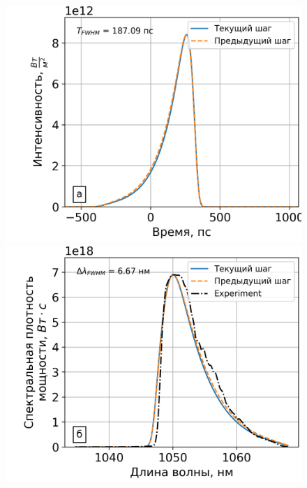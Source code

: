 \documentclass[12pt]{article}
\begin{document}
\begin{figure}[h!]
  \centering
  \begin{minipage}[b]{0.5\textwidth}
    \includegraphics[width=\linewidth]{Images/Gauss Pulse/Импульс и спектр/!23. Fiber_pusle}
  \end{minipage}%
  \begin{minipage}[b]{0.5\textwidth}
    \includegraphics[width=\linewidth]{Images/Gauss Pulse/Импульс и спектр/!23. Fiber_spectrum}
  \end{minipage}

  \vspace{}


\end{figure}
\end{document}
